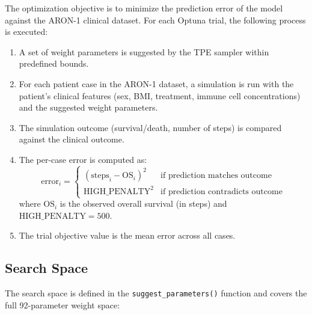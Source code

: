 The optimization objective is to minimize the prediction error of the model against the ARON-1 clinical dataset. For each Optuna trial, the following process is executed:

\begin{enumerate}
    \item A set of weight parameters is suggested by the TPE sampler within predefined bounds.
    \item For each patient case in the ARON-1 dataset, a simulation is run with the patient's clinical features (sex, BMI, treatment, immune cell concentrations) and the suggested weight parameters.
    \item The simulation outcome (survival/death, number of steps) is compared against the clinical outcome.
    \item The per-case error is computed as:
    \begin{equation}
        \text{error}_i = \begin{cases}
            (\text{steps}_i - \text{OS}_i)^2 & \text{if prediction matches outcome} \\
            \text{HIGH\_PENALTY}^2 & \text{if prediction contradicts outcome}
        \end{cases}
    \end{equation}
    where $\text{OS}_i$ is the observed overall survival (in steps) and $\text{HIGH\_PENALTY} = 500$.
    \item The trial objective value is the mean error across all cases.
\end{enumerate}

\subsection{Search Space}

The search space is defined in the \texttt{suggest\_parameters()} function and covers the full 92-parameter weight space:

